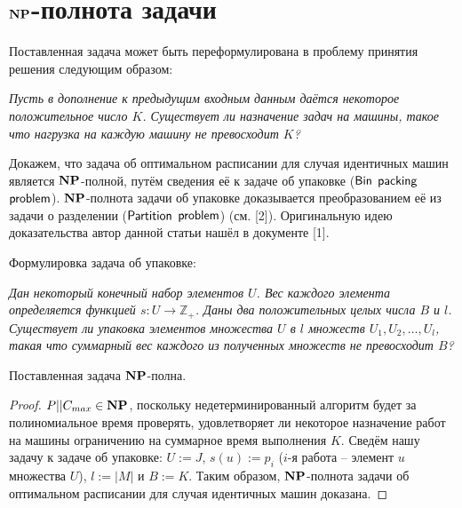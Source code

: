 \section{$\bf{NP}$-полнота задачи}

Поставленная задача может быть переформулирована в проблему принятия решения следующим образом:

\textit{Пусть в дополнение к предыдущим входным данным даётся некоторое положительное число $K$. Существует ли назначение задач на машины, такое что нагрузка на каждую машину не превосходит $K$?}

Докажем, что задача об оптимальном расписании для случая идентичных машин является $\bf{NP}$-полной, путём сведения её к задаче об упаковке ($\sf{Bin}$ $\sf{packing}$ $\sf{problem}$). $\bf{NP}$-полнота задачи об упаковке доказывается преобразованием её из задачи о разделении ($\sf{Partition}$ $\sf{problem}$) (см. [2]). Оригинальную идею доказательства автор данной статьи нашёл в документе [1].

Формулировка задача об упаковке:

\textit{Дан некоторый конечный набор элементов $U$. Вес каждого элемента определяется функцией $s: U \rightarrow \mathbb{Z}_{+}$. Даны два положительных целых числа $B$ и $l$. Существует ли упаковка элементов множества $U$ в $l$ множеств $U_{1}, U_{2}, \ldots, U_{l}$, такая что суммарный вес каждого из полученных множеств не превосходит $B$?}

\begin{theorem}
    Поставленная задача $\bf{NP}$-полна.
\end{theorem}

\begin{proof}
    $P||C_{max} \in \bf{NP}$, поскольку недетерминированный алгоритм будет за полиномиальное время проверять, удовлетворяет ли некоторое назначение работ на машины ограничению на суммарное время выполнения $K$. Сведём нашу задачу к задаче об упаковке: $U := J$, $s(u) := p_{i}$ ($i$-я работа -- элемент $u$ множества $U$), $l := |M|$ и $B := K$. Таким образом, $\bf{NP}$-полнота задачи об оптимальном расписании для случая идентичных машин доказана.
\end{proof}